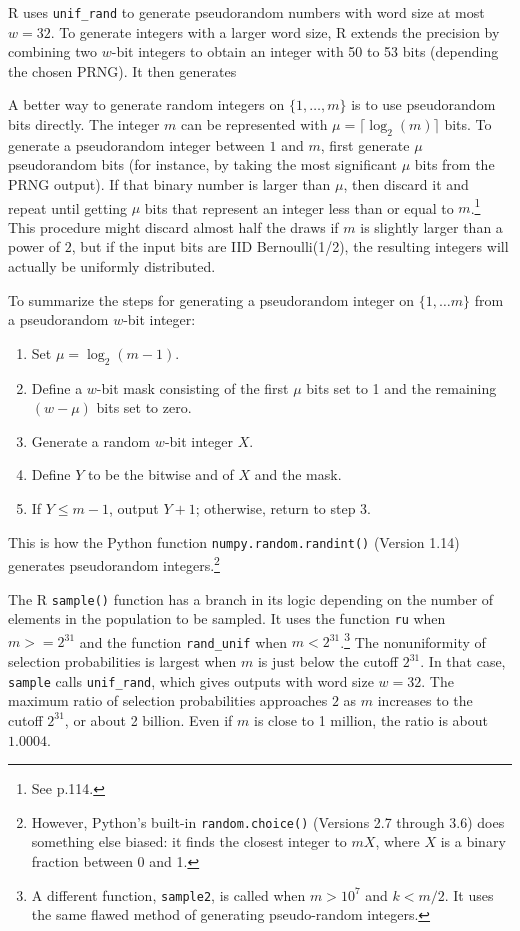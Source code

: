 \documentclass[12pt]{article}
\begin{document}
R uses \texttt{unif\_rand} to generate pseudorandom numbers with word size at most $w=32$.
To generate integers with a larger word size, R extends the precision by combining two $w$-bit integers to obtain an integer with 50 to 53 bits (depending the chosen PRNG). 
It then generates

A better way to generate random integers on $\{1, \dots, m\}$ is to use pseudorandom bits directly. 
The integer $m$ can be represented with $\mu = \lceil \log_2(m) \rceil$ bits. 
To generate a pseudorandom integer between $1$ and $m$, first generate $\mu$ pseudorandom bits (for instance, by taking the most significant $\mu$ bits from the PRNG output).  
If that binary number is larger than $\mu$, then discard it and repeat until getting $\mu$ bits that represent an integer less than or equal to $m$.\footnote{%
   See \citet{knuth_art_1997} p.114.
}
This procedure might discard almost half the draws if $m$ is slightly larger than a power of $2$,
but if the input bits are IID Bernoulli(1/2), the resulting integers will actually be uniformly distributed.

To summarize the steps for generating a pseudorandom integer on $\{1, \ldots m\}$ from a pseudorandom $w$-bit integer:
\begin{enumerate}
\item Set $\mu = \log_2(m-1)$.
\item Define a $w$-bit mask consisting of the first $\mu$ bits set to 1 and the remaining $(w-\mu)$ bits set to zero.
\item Generate a random $w$-bit integer $X$.
\item Define $Y$ to be the bitwise and of $X$ and the mask.
\item If $Y \le m-1$, output $Y+1$; otherwise, return to step 3.
\end{enumerate}
This is how the Python function \texttt{numpy.random.randint()} (Version 1.14) generates pseudorandom integers.\footnote{%
However, Python's built-in \texttt{random.choice()} (Versions 2.7 through 3.6) does something else biased: it finds the closest integer to $mX$, where $X$ is a binary fraction between 0 and 1.
}

The R \texttt{sample()} function has a branch in its logic depending on the number of elements
in the population to be sampled. 
It uses the function \texttt{ru} when $m >= 2^{31}$ and the function \texttt{rand\_unif} when $m < 2^{31}$.\footnote{
A different function, \texttt{sample2}, is called when $m > 10^7$ and $k < m/2$.
It uses the same flawed method of generating pseudo-random integers.
}
The nonuniformity of selection probabilities is largest when $m$ is just below the cutoff $2^{31}$. 
In that case, \texttt{sample} calls \texttt{unif\_rand}, which gives outputs with word size $w=32$. 
The maximum ratio of selection probabilities approaches $2$ as $m$ increases to the cutoff $2^{31}$, or about 2 billion. 
Even if $m$ is close to 1 million, the ratio is about $1.0004$.
\end{document}
